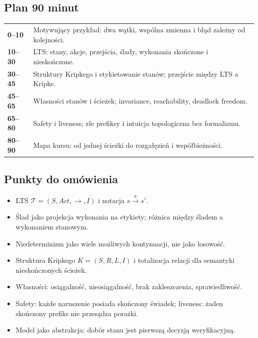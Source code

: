 \documentclass[11pt,a4paper]{article}
\begin{document}
\subsection{Plan 90 minut}
\begin{center}\small\begin{tabularx}{0.96\textwidth}{@{}>{\bfseries}p{18mm}X@{}}
0--10 & Motywujący przykład: dwa wątki, wspólna zmienna i błąd zależny od kolejności.\\
10--30 & LTS: stany, akcje, przejścia, ślady, wykonania skończone i nieskończone.\\
30--45 & Struktury Kripkego i etykietowanie stanów; przejście między LTS a Kripke.\\
45--65 & Własności stanów i ścieżek; invariance, reachability, deadlock freedom.\\
65--80 & Safety i liveness; złe prefiksy i intuicja topologiczna bez formalizmu.\\
80--90 & Mapa kursu: od jednej ścieżki do rozgałęzień i współbieżności.\\
\end{tabularx}\end{center}

\subsection{Punkty do omówienia}
\begin{itemize}
\item LTS $\mathcal{T}=(S,Act,\to,I)$ i notacja $s\xrightarrow{a}s'$.
\item Ślad jako projekcja wykonania na etykiety; różnica między śladem a wykonaniem stanowym.
\item Niedeterminizm jako wiele możliwych kontynuacji, nie jako losowość.
\item Struktura Kripkego $K=(S,R,L,I)$ i totalizacja relacji dla semantyki nieskończonych ścieżek.
\item Własności: osiągalność, nieosiągalność, brak zakleszczenia, sprawiedliwość.
\item Safety: każde naruszenie posiada skończony świadek; liveness: żaden skończony prefiks nie przesądza porażki.
\item Model jako abstrakcja: dobór stanu jest pierwszą decyzją weryfikacyjną.
\end{itemize}
\end{document}
